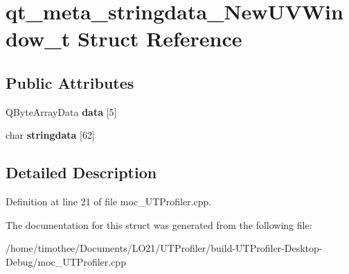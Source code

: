 \hypertarget{structqt__meta__stringdata___new_u_v_window__t}{\section{qt\-\_\-meta\-\_\-stringdata\-\_\-\-New\-U\-V\-Window\-\_\-t Struct Reference}
\label{structqt__meta__stringdata___new_u_v_window__t}
}
\subsection*{Public Attributes}
\begin{DoxyCompactItemize}
\item 
\hypertarget{structqt__meta__stringdata___new_u_v_window__t_a07a2059bda726b169e79aae235bdfe4f}{Q\-Byte\-Array\-Data {\bfseries data} \mbox{[}5\mbox{]}}\label{structqt__meta__stringdata___new_u_v_window__t_a07a2059bda726b169e79aae235bdfe4f}

\item 
\hypertarget{structqt__meta__stringdata___new_u_v_window__t_ae2c41912179cb2fa30419e9a743aefd5}{char {\bfseries stringdata} \mbox{[}62\mbox{]}}\label{structqt__meta__stringdata___new_u_v_window__t_ae2c41912179cb2fa30419e9a743aefd5}

\end{DoxyCompactItemize}


\subsection{Detailed Description}


Definition at line 21 of file moc\-\_\-\-U\-T\-Profiler.\-cpp.



The documentation for this struct was generated from the following file\-:\begin{DoxyCompactItemize}
\item 
/home/timothee/\-Documents/\-L\-O21/\-U\-T\-Profiler/build-\/\-U\-T\-Profiler-\/\-Desktop-\/\-Debug/moc\-\_\-\-U\-T\-Profiler.\-cpp\end{DoxyCompactItemize}
